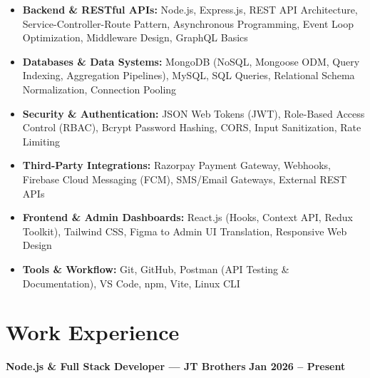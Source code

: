\documentclass[a4paper,10pt]{article}
\begin{document}
\begin{itemize}

    \item \textbf{Backend \& RESTful APIs:}
    Node.js, Express.js, REST API Architecture, Service-Controller-Route Pattern,
    Asynchronous Programming, Event Loop Optimization, Middleware Design, GraphQL Basics

    \item \textbf{Databases \& Data Systems:}
    MongoDB (NoSQL, Mongoose ODM, Query Indexing, Aggregation Pipelines),
    MySQL, SQL Queries, Relational Schema Normalization, Connection Pooling

    \item \textbf{Security \& Authentication:}
    JSON Web Tokens (JWT), Role-Based Access Control (RBAC),
    Bcrypt Password Hashing, CORS, Input Sanitization, Rate Limiting

    \item \textbf{Third-Party Integrations:}
    Razorpay Payment Gateway, Webhooks, Firebase Cloud Messaging (FCM),
    SMS/Email Gateways, External REST APIs

    \item \textbf{Frontend \& Admin Dashboards:}
    React.js (Hooks, Context API, Redux Toolkit), Tailwind CSS,
    Figma to Admin UI Translation, Responsive Web Design

    \item \textbf{Tools \& Workflow:}
    Git, GitHub, Postman (API Testing \& Documentation), VS Code, npm, Vite, Linux CLI

\end{itemize}

\section*{Work Experience}

\textbf{Node.js \& Full Stack Developer --- JT Brothers}
\hfill
\textbf{Jan 2026 -- Present}
\end{document}
